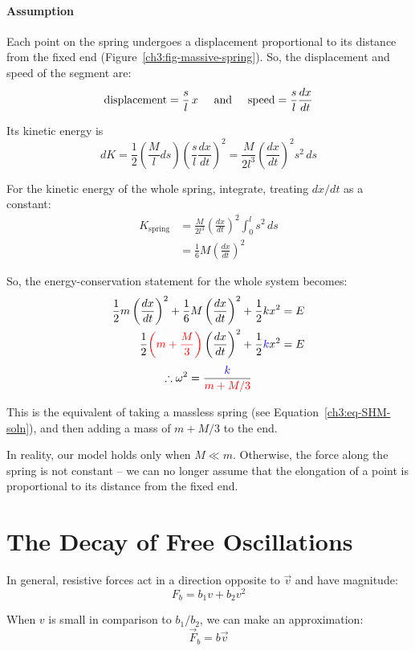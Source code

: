 \paragraph{Assumption} Each point on the spring undergoes a displacement proportional to its distance from the fixed end (Figure~\ref{ch3:fig-massive-spring}). So, the displacement and speed of the segment are:
\[ \text{displacement} = \frac{s}{l} \, x \hspace{0.5cm}\text{and}\hspace{0.5cm}
\text{speed} = \frac{s}{l} \frac{dx}{dt} 
\]

Its kinetic energy is \[ dK = \frac{1}{2}\left( \frac{M}{l} ds \right) \left( \frac{s}{l} \frac{dx}{dt} \right)^2 = \frac{M}{2l^3} \left( \frac{dx}{dt} \right)^2 s^2 \, ds \]

For the kinetic energy of the whole spring, integrate, treating $dx/dt$ as a constant:
\begin{align*}
K_\text{spring} &= \frac{M}{2l^3} \left( \frac{dx}{dt} \right)^2  \int_0^{l} s^2 \, ds \\
&= \frac{1}{6}M\left(\frac{dx}{dt}\right)^2
\end{align*}

So, the energy-conservation statement for the whole system becomes:
\begin{align*}
\frac{1}{2}m\left(\frac{dx}{dt}\right)^2 + \frac{1}{6}M\left( \frac{dx}{dt}\right)^2 + \frac{1}{2}kx^2 &= E  \\
\frac{1}{2} \textcolor{red}{\left( m + \frac{M}{3} \right)} \left(\frac{dx}{dt}\right)^2 + \frac{1}{2} \textcolor{blue}{k} x^2 &= E
\end{align*}
\[ \therefore \omega^2 = \frac{\textcolor{blue}{k}}{\textcolor{red}{m+M/3}} \]

This is the equivalent of taking a massless spring (see Equation~\ref{ch3:eq-SHM-soln}), and then adding a mass of $m + M/3$ to the end.

In reality, our model holds only when $M \ll m$. Otherwise, the force along the spring is not constant -- we can no longer assume that the elongation of a point is proportional to its distance from the fixed end.

\section{The Decay of Free Oscillations}

In general, resistive forces act in a direction opposite to $\vec{v}$ and have magnitude:
\[ F_b = b_1v + b_2v^2\]

When $v$ is small in comparison to $b_1/b_2$, we can make an approximation:
\begin{equation*}
	\boxed{\vec{F}_b = b\vec{v}}
\end{equation*}

